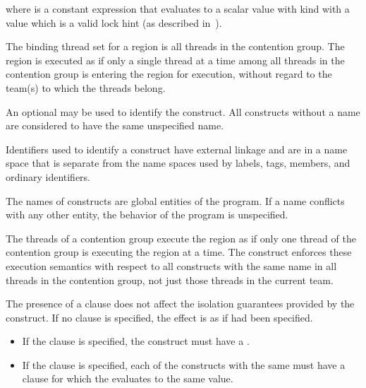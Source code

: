 where  is a constant expression that evaluates to
a scalar value with kind  with a value
which is a valid lock hint (as described 
in~).
\fortranspecificend

\binding
The binding thread set for a  region is all threads in the contention group. 
The region is executed as if only a single thread at a time among all threads in the 
contention group is entering the region for execution, without regard to the team(s) to which the threads belong. 

\descr
An optional  may be used to identify the  construct. All  
constructs without a name are considered to have the same unspecified name. 

\ccppspecificstart
Identifiers used to identify a  construct have external linkage and are in a 
name space that is separate from the name spaces used by labels, tags, members, and 
ordinary identifiers.
\ccppspecificend

\fortranspecificstart
The names of  constructs are global entities of the program. If a name 
conflicts with any other entity, the behavior of the program is unspecified.
\fortranspecificend

The threads of a contention group execute the  region as if only one thread of the contention group is executing the  region at a time.
The  construct enforces these execution semantics with respect to all  constructs with the same name in all 
threads in the contention group, not just those threads in the current team.

The presence of a  clause does not affect the isolation
guarantees provided by the  construct. If no
 clause is specified, the effect is as if 
had been specified.



\restrictions
\begin{itemize}
\item If the  clause is specified, the  
      construct must have a .
\item If the  clause is specified, each of the
   constructs with the same  must have a
   clause for which the  evaluates to the same
  value.

\end{itemize}


